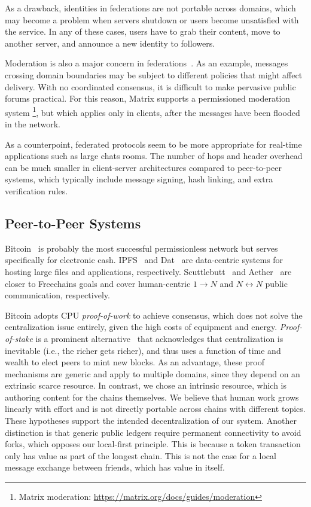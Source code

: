 \documentclass[10pt,journal,compsoc]{IEEEtran}
\newcommand{\FC}       {Freechains\xspace}
\newcommand{\Xon} {$1{\rightarrow}N$\xspace}
\newcommand{\Xnn} {$N{\leftrightarrow}N$\xspace}
\begin{document}
As a drawback, identities in federations are not portable across domains, which
may become a problem when servers shutdown or users become unsatisfied with the
service.
In any of these cases, users have to grab their content, move to another
server, and announce a new identity to followers.

Moderation is also a major concern in federations~\cite{p2p.ecosystem}.
As an example, messages crossing domain boundaries may be subject to different
policies that might affect delivery.
With no coordinated consensus, it is difficult to make pervasive public forums
practical.
%
For this reason, Matrix supports a permissioned moderation system%
\footnote{Matrix moderation: \url{https://matrix.org/docs/guides/moderation}},
but which applies only in clients, after the messages have been flooded in the
network.

As a counterpoint, federated protocols seem to be more appropriate for
real-time applications such as large chats rooms.
The number of hops and header overhead can be much smaller in client-server
architectures compared to peer-to-peer systems, which typically include message
signing, hash linking, and extra verification rules.

\subsection{Peer-to-Peer Systems}

Bitcoin~\cite{p2p.bitcoin} is probably the most successful permissionless
network but serves specifically for electronic cash.
IPFS~\cite{p2p.ipfs} and Dat~\cite{p2p.dat} are data-centric systems for
hosting large files and applications, respectively.
Scuttlebutt~\cite{p2p.scuttlebutt} and Aether~\cite{p2p.ecosystem} are closer
to \FC goals and cover human-centric \Xon and \Xnn public communication,
respectively.

Bitcoin adopts CPU \emph{proof-of-work} to achieve consensus, which does not
solve the centralization issue entirely, given the high costs of equipment and
energy.
\emph{Proof-of-stake} is a prominent alternative~\cite{p2p.proofs} that
acknowledges that centralization is inevitable (i.e., the richer gets richer),
and thus uses a function of time and wealth to elect peers to mint new blocks.
As an advantage, these proof mechanisms are generic and apply to multiple
domains, since they depend on an extrinsic scarce resource.
%
In contrast, we chose an intrinsic resource, which is authoring content for the
chains themselves.
We believe that human work grows linearly with effort and is not directly
portable across chains with different topics.
These hypotheses support the intended decentralization of our system.
%
Another distinction is that generic public ledgers require permanent
connectivity to avoid forks, which opposes our local-first principle.
This is because a token transaction only has value as part of the longest
chain.
This is not the case for a local message exchange between friends, which has
value in itself.
\end{document}
